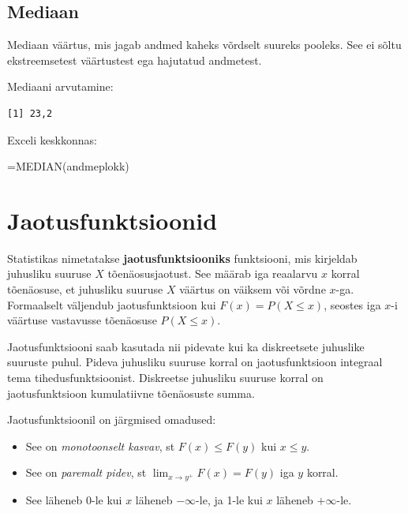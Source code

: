 \documentclass[
]{book}
\newenvironment{Shaded}{\begin{snugshade}}{\end{snugshade}}
\newcommand{\FunctionTok}[1]{\textcolor[rgb]{0.13,0.29,0.53}{\textbf{#1}}}
\newcommand{\NormalTok}[1]{#1}
\newcommand{\SpecialCharTok}[1]{\textcolor[rgb]{0.81,0.36,0.00}{\textbf{#1}}}
\providecommand{\tightlist}{%
  \setlength{\itemsep}{0pt}\setlength{\parskip}{0pt}}
\renewenvironment{Shaded} {\begin{snugshade}\footnotesize} {\end{snugshade}}
\begin{document}
\section{Mediaan}\label{mediaan}

Mediaan väärtus, mis jagab andmed kaheks võrdselt suureks pooleks. See ei sõltu ekstreemsetest väärtustest ega hajutatud andmetest.

Mediaani arvutamine:

\begin{Shaded}
\end{Shaded}

\begin{verbatim}
[1] 23,2
\end{verbatim}

Exceli keskkonnas:

\begin{Shaded}
\begin{Highlighting}[]
\NormalTok{=MEDIAN(andmeplokk)}
\end{Highlighting}
\end{Shaded}

\chapter{Jaotusfunktsioonid}\label{jaotusfunktsioonid}

Statistikas nimetatakse \textbf{jaotusfunktsiooniks} funktsiooni, mis kirjeldab juhusliku suuruse \(X\) tõenäosusjaotust. See määrab iga reaalarvu \(x\) korral tõenäosuse, et juhusliku suuruse \(X\) väärtus on väiksem või võrdne \(x\)-ga. Formaalselt väljendub jaotusfunktsioon kui \(F(x) = P(X \leq x)\), seostes iga \(x\)-i väärtuse vastavusse tõenäosuse \(P(X \leq x)\).

Jaotusfunktsiooni saab kasutada nii pidevate kui ka diskreetsete juhuslike suuruste puhul. Pideva juhusliku suuruse korral on jaotusfunktsioon integraal tema tihedusfunktsioonist. Diskreetse juhusliku suuruse korral on jaotusfunktsioon kumulatiivne tõenäosuste summa.

Jaotusfunktsioonil on järgmised omadused:

\begin{itemize}
\tightlist
\item
  See on \emph{monotoonselt kasvav}, st \(F(x) \le F(y)\) kui \(x \le y\).
\item
  See on \emph{paremalt pidev}, st \(\lim_{x \to y^+} F(x) = F(y)\) iga \(y\) korral.
\item
  See läheneb 0-le kui \(x\) läheneb \(-\infty\)-le, ja 1-le kui \(x\) läheneb \(+\infty\)-le.
\end{itemize}
\end{document}
